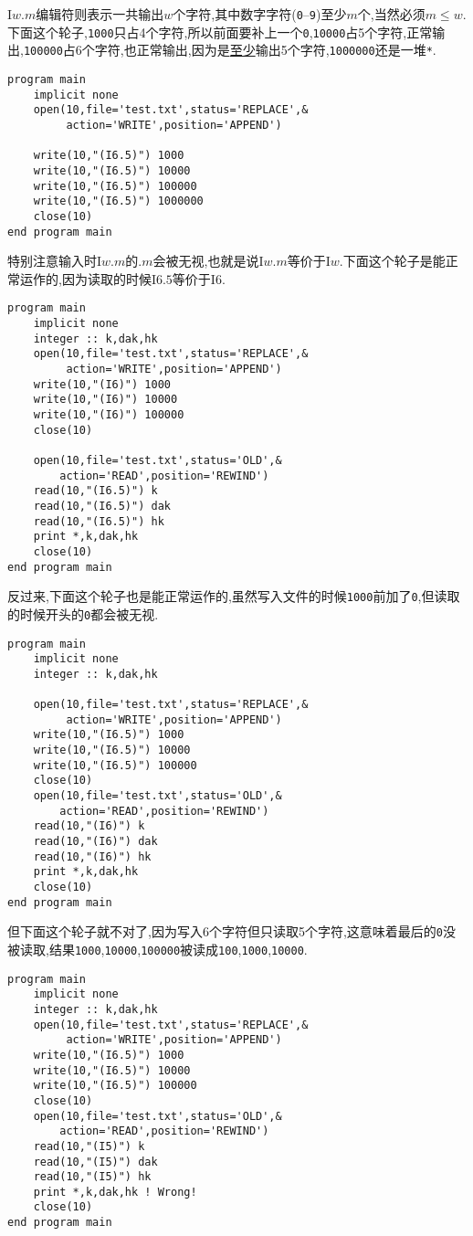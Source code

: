 I$w.m$编辑符则表示一共输出$w$个字符,其中数字字符(\texttt{0}--\texttt{9})至少$m$个,当然必须$m\leqslant  w$.下面这个轮子,\texttt{1000}只占4个字符,所以前面要补上一个\texttt{0},\texttt{10000}占5个字符,正常输出,\texttt{100000}占6个字符,也正常输出,因为是\uline{至少}输出5个字符,\texttt{1000000}还是一堆\texttt{*}.
\begin{lstlisting}
program main
    implicit none
    open(10,file='test.txt',status='REPLACE',&
         action='WRITE',position='APPEND')

    write(10,"(I6.5)") 1000
    write(10,"(I6.5)") 10000
    write(10,"(I6.5)") 100000
    write(10,"(I6.5)") 1000000
    close(10)
end program main
\end{lstlisting}
特别注意输入时I$w.m$的$.m$会被无视,也就是说I$w.m$等价于I$w$.下面这个轮子是能正常运作的,因为读取的时候I$6.5$等价于I$6$.
\begin{lstlisting}
program main
    implicit none
    integer :: k,dak,hk
    open(10,file='test.txt',status='REPLACE',&
         action='WRITE',position='APPEND')
    write(10,"(I6)") 1000
    write(10,"(I6)") 10000
    write(10,"(I6)") 100000
    close(10)

    open(10,file='test.txt',status='OLD',&
        action='READ',position='REWIND')
    read(10,"(I6.5)") k
    read(10,"(I6.5)") dak
    read(10,"(I6.5)") hk
    print *,k,dak,hk
    close(10)
end program main
\end{lstlisting}
反过来,下面这个轮子也是能正常运作的,虽然写入文件的时候\texttt{1000}前加了\texttt{0},但读取的时候开头的\texttt{0}都会被无视.
\begin{lstlisting}
program main
    implicit none
    integer :: k,dak,hk

    open(10,file='test.txt',status='REPLACE',&
         action='WRITE',position='APPEND')
    write(10,"(I6.5)") 1000
    write(10,"(I6.5)") 10000
    write(10,"(I6.5)") 100000
    close(10)
    open(10,file='test.txt',status='OLD',&
        action='READ',position='REWIND')
    read(10,"(I6)") k
    read(10,"(I6)") dak
    read(10,"(I6)") hk
    print *,k,dak,hk
    close(10)
end program main
\end{lstlisting}
但下面这个轮子就不对了,因为写入6个字符但只读取5个字符,这意味着最后的\texttt{0}没被读取,结果\texttt{1000},\texttt{10000},\texttt{100000}被读成\texttt{100},\texttt{1000},\texttt{10000}.
\begin{lstlisting}
program main
    implicit none
    integer :: k,dak,hk
    open(10,file='test.txt',status='REPLACE',&
         action='WRITE',position='APPEND')
    write(10,"(I6.5)") 1000
    write(10,"(I6.5)") 10000
    write(10,"(I6.5)") 100000
    close(10)
    open(10,file='test.txt',status='OLD',&
        action='READ',position='REWIND')
    read(10,"(I5)") k
    read(10,"(I5)") dak
    read(10,"(I5)") hk
    print *,k,dak,hk ! Wrong!
    close(10)
end program main
\end{lstlisting}

